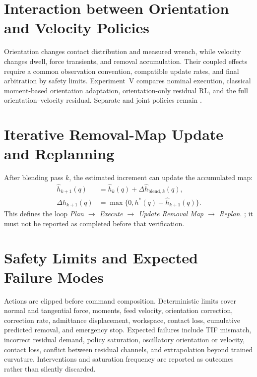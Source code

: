 \section{Interaction between Orientation and Velocity Policies}
Orientation changes contact distribution and measured wrench, while velocity changes dwell, force transients, and removal accumulation. Their coupled effects require a common observation convention, compatible update rates, and final arbitration by safety limits. Experiment~V compares nominal execution, classical moment-based orientation adaptation, orientation-only residual RL, and the full orientation--velocity residual. Separate and joint policies remain .

\section{Iterative Removal-Map Update and Replanning}
After blending pass \(k\), the estimated increment can update the accumulated map:
\begin{align}
  \hat h_{k+1}(q)
  &=\hat h_k(q)+\Delta\hat h_{\mathrm{blend},k}(q),\\
  \Delta h_{k+1}(q)
  &=\max\{0,h^*(q)-\hat h_{k+1}(q)\}.
  \label{eq:iterative_update}
\end{align}
This defines the loop \emph{Plan \(\rightarrow\) Execute \(\rightarrow\) Update Removal Map \(\rightarrow\) Replan}. ; it must not be reported as completed before that verification.

\section[Safety Limits and Expected Failure Modes]{Safety Limits and Expected\\ Failure Modes}
Actions are clipped before command composition. Deterministic limits cover normal and tangential force, moments, feed velocity, orientation correction, correction rate, admittance displacement, workspace, contact loss, cumulative predicted removal, and emergency stop. Expected failures include TIF mismatch, incorrect residual demand, policy saturation, oscillatory orientation or velocity, contact loss, conflict between residual channels, and extrapolation beyond trained curvature. Interventions and saturation frequency are reported as outcomes rather than silently discarded.
